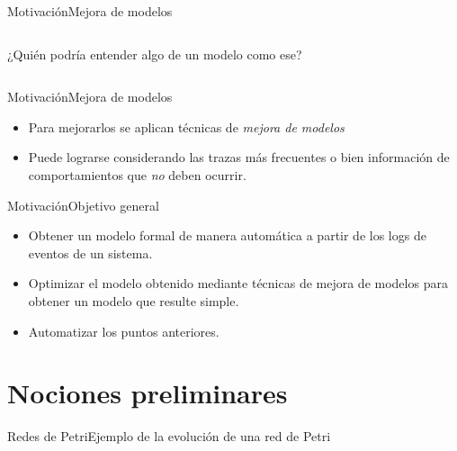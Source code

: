 \documentclass[spanish,pdf]{beamer}
\begin{document}
\begin{frame}{Motivación}{Mejora de modelos}
\begin{columns}
      ¿Quién podría entender algo de un modelo como ese?
  \end{columns}
\end{frame}

\begin{frame}{Motivación}{Mejora de modelos}
   \begin{itemize}
      \setlength\itemsep{0.4cm}
      \item<1-> Para mejorarlos se aplican técnicas de \textit{mejora de modelos}
      \item<2-> Puede lograrse considerando las trazas más frecuentes o bien información de comportamientos que \textit{no} deben ocurrir.
    \end{itemize}
\end{frame}

\begin{frame}{Motivación}{Objetivo general}
  \begin{itemize}
    \setlength\itemsep{0.4cm}

    \item<1-> Obtener un modelo formal de manera automática a partir de los logs de eventos de un sistema.
    
    \item<2-> Optimizar el modelo obtenido mediante técnicas de mejora de modelos para obtener un modelo que
          resulte simple.
    
    \item<3-> Automatizar los puntos anteriores.

  \end{itemize}
\end{frame}

\section{Nociones preliminares}

\begin{frame}{Redes de Petri}{Ejemplo de la evolución de una red de Petri}
  \begin{columns}
      \centering
      
  \end{columns}
\end{frame}
\end{document}
